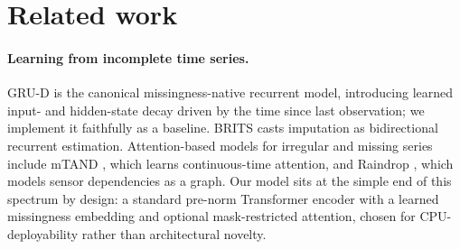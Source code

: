 \documentclass[review,3p,times]{elsarticle}
\begin{document}
\section{Related work}
\label{sec:related}

\paragraph{Learning from incomplete time series.}
GRU-D \citep{che2018grud} is the canonical missingness-native recurrent model,
introducing learned input- and hidden-state decay driven by the time since last
observation; we implement it faithfully as a baseline. BRITS \citep{cao2018brits}
casts imputation as bidirectional recurrent estimation. Attention-based models
for irregular and missing series include mTAND \citep{shukla2021mtan}, which
learns continuous-time attention, and Raindrop \citep{zhang2022raindrop}, which
models sensor dependencies as a graph. Our model sits at the simple end of this
spectrum by design: a standard pre-norm Transformer encoder with a learned
missingness embedding and optional mask-restricted attention, chosen for
CPU-deployability rather than architectural novelty.
\end{document}
